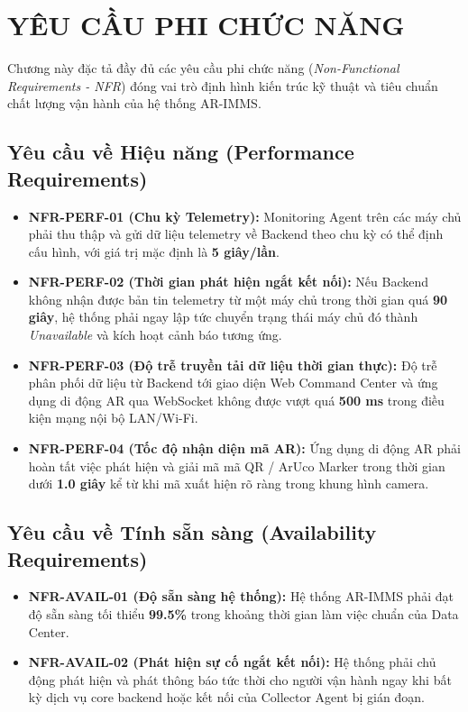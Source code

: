 \chapter{YÊU CẦU PHI CHỨC NĂNG}

Chương này đặc tả đầy đủ các yêu cầu phi chức năng (\textit{Non-Functional Requirements - NFR}) đóng vai trò định hình kiến trúc kỹ thuật và tiêu chuẩn chất lượng vận hành của hệ thống AR-IMMS.

\section{Yêu cầu về Hiệu năng (Performance Requirements)}
\begin{itemize}
    \item \textbf{NFR-PERF-01 (Chu kỳ Telemetry):} Monitoring Agent trên các máy chủ phải thu thập và gửi dữ liệu telemetry về Backend theo chu kỳ có thể định cấu hình, với giá trị mặc định là \textbf{5 giây/lần}.
    \item \textbf{NFR-PERF-02 (Thời gian phát hiện ngắt kết nối):} Nếu Backend không nhận được bản tin telemetry từ một máy chủ trong thời gian quá \textbf{90 giây}, hệ thống phải ngay lập tức chuyển trạng thái máy chủ đó thành \textit{Unavailable} và kích hoạt cảnh báo tương ứng.
    \item \textbf{NFR-PERF-03 (Độ trễ truyền tải dữ liệu thời gian thực):} Độ trễ phân phối dữ liệu từ Backend tới giao diện Web Command Center và ứng dụng di động AR qua WebSocket không được vượt quá \textbf{500 ms} trong điều kiện mạng nội bộ LAN/Wi-Fi.
    \item \textbf{NFR-PERF-04 (Tốc độ nhận diện mã AR):} Ứng dụng di động AR phải hoàn tất việc phát hiện và giải mã mã QR / ArUco Marker trong thời gian dưới \textbf{1.0 giây} kể từ khi mã xuất hiện rõ ràng trong khung hình camera.
\end{itemize}

\section{Yêu cầu về Tính sẵn sàng (Availability Requirements)}
\begin{itemize}
    \item \textbf{NFR-AVAIL-01 (Độ sẵn sàng hệ thống):} Hệ thống AR-IMMS phải đạt độ sẵn sàng tối thiểu \textbf{99.5\%} trong khoảng thời gian làm việc chuẩn của Data Center.
    \item \textbf{NFR-AVAIL-02 (Phát hiện sự cố ngắt kết nối):} Hệ thống phải chủ động phát hiện và phát thông báo tức thời cho người vận hành ngay khi bất kỳ dịch vụ core backend hoặc kết nối của Collector Agent bị gián đoạn.
\end{itemize}

